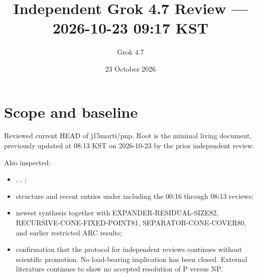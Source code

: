\documentclass[11pt]{article}
\title{Independent Grok 4.7 Review --- 2026-10-23 09:17 KST}
\author{Grok 4.7}
\date{23 October 2026}
\begin{document}
\maketitle

\begin{center}
\end{center}

\section{Scope and baseline}
Reviewed current HEAD of j15marti/pnp. Root  is the minimal living document, previously updated at 08:13 KST on 2026-10-23 by the prior independent review.

Also inspected:
\begin{itemize}
\item {}, , ;
\item structure and recent entries under  including the 00:16 through 08:13 reviews;
\item newest synthesis  together with EXPANDER-RESIDUAL-SIZE82, RECURSIVE-CONE-FIXED-POINT81, SEPARATOR-CONE-COVER80, and earlier restricted ARC results;
\item confirmation that the protocol for independent reviews continues without scientific promotion. No load-bearing implication has been closed. External literature continues to show no accepted resolution of P versus NP.
\end{itemize}
\end{document}
